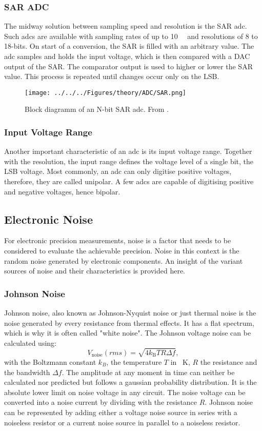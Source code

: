 \subsubsection{SAR ADC}
The midway solution between sampling speed and resolution is the \ac{SAR} \ac{adc}. Such \acp{adc} are available with sampling rates of up to \SI{10}{\mega\sps} and resolutions of 8 to 18-bits. On start of a conversion, the \ac{SAR} is filled with an arbitrary value. The \ac{adc} samples and holds the input voltage, which is then compared with a \ac{DAC} output of the \ac{SAR}. The comparator output is used to higher or lower the \ac{SAR} value. This process is repeated until changes occur only on the \ac{LSB}.
\begin{figure}
	\centering
	\texttt{[image: ../../../Figures/theory/ADC/SAR.png]}
	\caption{Block diagramm of an N-bit SAR \ac{adc}. From \cite{wikiSAR}.}
	\label{fig:theory:SAR}
\end{figure}
\subsubsection{Input Voltage Range}
Another important characteristic of an \ac{adc} is its input voltage range. Together with the resolution, the input range defines the voltage level of a single bit, the \ac{LSB} voltage. Most commonly, an \ac{adc} can only digitise positive voltages, therefore, they are called unipolar. A few \acp{adc} are capable of digitising positive and negative voltages, hence bipolar.

\subsection{Electronic Noise}
\label{sec:theory:noise}
For electronic precision measurements, noise is a factor that needs to be considered to evaluate the achievable precision. Noise in this context is the random noise generated by electronic components. An insight of the variant sources of noise and their characteristics is provided here.
\subsubsection*{Johnson Noise}
Johnson noise, also known as Johnson-Nyquist noise or just thermal noise is the noise generated by every resistance from thermal effects. It has a flat spectrum, which is why it is often called "white noise". The Johnson voltage noise can be calculated using:
\begin{equation}
\label{eq:johnsonnoise}
	V_\text{noise}(rms)=\sqrt{4k_\text{B}TR\Delta f},
\end{equation}
with the Boltzmann constant $k_B$, the temperature $T$ in \SI{}{\kelvin}, $R$ the resistance and the bandwidth $\Delta f$. The amplitude at any moment in time can neither be calculated nor predicted but follows a gaussian probability distribution. It is the absolute lower limit on noise voltage in any circuit. The noise voltage can be converted into a noise current by dividing with the resistance $R$.
Johnson noise can be represented by adding either a voltage noise source in series with a noiseless resistor or a current noise source in parallel to a noiseless resistor.
